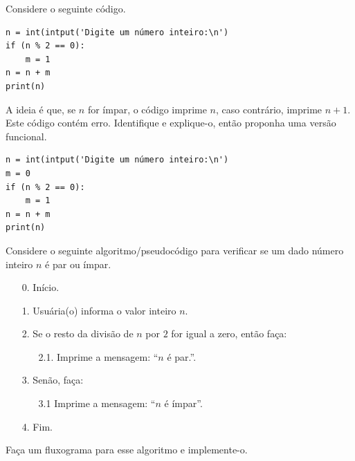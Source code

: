 \begin{exer}
  Considere o seguinte código.

\begin{lstlisting}
n = int(intput('Digite um número inteiro:\n')
if (n % 2 == 0):
    m = 1
n = n + m
print(n)
\end{lstlisting}

A ideia é que, se $n$ for ímpar, o código imprime $n$, caso contrário, imprime $n+1$. Este código contém erro. Identifique e explique-o, então proponha uma versão funcional.
\end{exer}
\begin{resp}

\begin{lstlisting}
n = int(intput('Digite um número inteiro:\n')
m = 0
if (n % 2 == 0):
    m = 1
n = n + m
print(n)
\end{lstlisting}

\end{resp}

\begin{exer}
  Considere o seguinte algoritmo/pseudocódigo para verificar se um dado número inteiro $n$ é par ou ímpar.
\begin{itemize}\setlength\itemsep{0em}
\item[0.] Início.
\item[1.] Usuária(o) informa o valor inteiro $n$.
\item[2.] Se o resto da divisão de $n$ por $2$ for igual a zero, então faça:
  \begin{itemize}\setlength\itemsep{0em}
  \item[2.1.] Imprime a mensagem: ``$n$ é par.''.
  \end{itemize}
\item[3.] Senão, faça:
  \begin{itemize}\setlength\itemsep{0em}
  \item[3.1] Imprime a mensagem: ``$n$ é ímpar''. 
  \end{itemize}
\item[4.] Fim.
\end{itemize}
Faça um fluxograma para esse algoritmo e implemente-o.
\end{exer}


